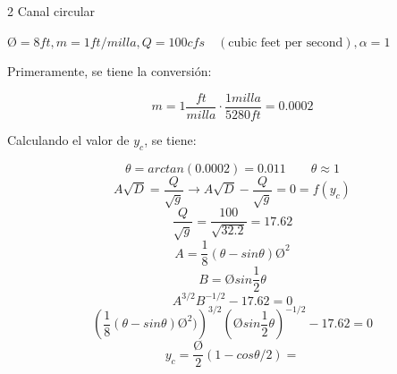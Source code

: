 \documentclass[11pt, oneside]{article}
\begin{document}
\begin{eje}{}{2}
    Canal circular

    $Ø=8ft, m=1ft/milla, Q=100 cfs \quad (\text{cubic feet per second}), \alpha=1$

    
    Primeramente, se tiene la conversión:

    $$m=1\dfrac{ft}{milla}\cdot\dfrac{1milla}{5280ft}=0.0002$$

    Calculando el valor de $y_c$, se tiene:

    $$\theta=arctan(0.0002)=0.011  \qquad \theta \approx 1$$
    $$A\sqrt{D}=\dfrac{Q}{\sqrt{g}}\rightarrow A\sqrt{D}-\dfrac{Q}{\sqrt{g}}=0=f(y_c)$$
    $$\dfrac{Q}{\sqrt{g}}=\dfrac{100}{\sqrt{32.2}}=17.62$$
    $$A=\dfrac{1}{8}(\theta-sin\theta)Ø^{2}$$
    $$B=Øsin\dfrac{1}{2}\theta$$
    $$A^{3/2}B^{-1/2}-17.62=0$$
    $$\left(\dfrac{1}{8}(\theta-sin\theta)Ø^{2})\right)^{3/2}\left(Øsin\dfrac{1}{2}\theta\right)^{-1/2}-17.62=0$$
    $$y_c=\dfrac{Ø}{2}(1-cos\theta/2)=$$


    
\end{eje}

\end{document}
